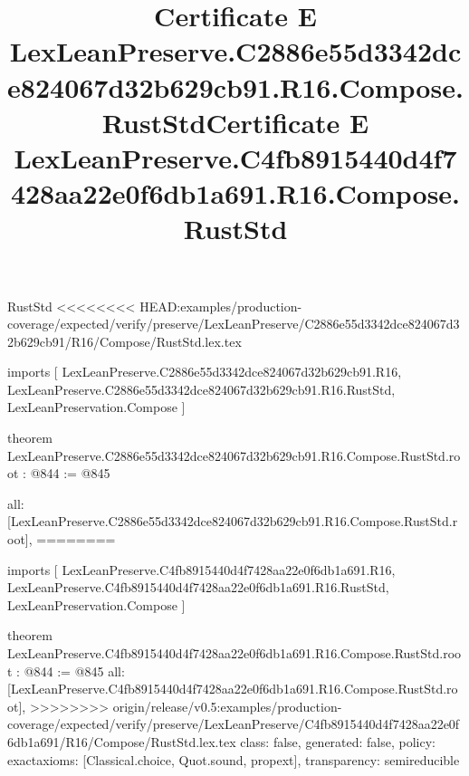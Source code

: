 \begin{lexlean}{RustStd}
<<<<<<<< HEAD:examples/production-coverage/expected/verify/preserve/LexLeanPreserve/C2886e55d3342dce824067d32b629cb91/R16/Compose/RustStd.lex.tex
\title{Certificate E LexLeanPreserve.C2886e55d3342dce824067d32b629cb91.R16.Compose.RustStd}
\begin{coremodule}
imports [
  LexLeanPreserve.C2886e55d3342dce824067d32b629cb91.R16,
  LexLeanPreserve.C2886e55d3342dce824067d32b629cb91.R16.RustStd,
  LexLeanPreservation.Compose
]

theorem LexLeanPreserve.C2886e55d3342dce824067d32b629cb91.R16.Compose.RustStd.root : @844 := @845 {
  all: [LexLeanPreserve.C2886e55d3342dce824067d32b629cb91.R16.Compose.RustStd.root],
========
\title{Certificate E LexLeanPreserve.C4fb8915440d4f7428aa22e0f6db1a691.R16.Compose.RustStd}
\begin{coremodule}
imports [
  LexLeanPreserve.C4fb8915440d4f7428aa22e0f6db1a691.R16,
  LexLeanPreserve.C4fb8915440d4f7428aa22e0f6db1a691.R16.RustStd,
  LexLeanPreservation.Compose
]

theorem LexLeanPreserve.C4fb8915440d4f7428aa22e0f6db1a691.R16.Compose.RustStd.root : @844 := @845 {
  all: [LexLeanPreserve.C4fb8915440d4f7428aa22e0f6db1a691.R16.Compose.RustStd.root],
>>>>>>>> origin/release/v0.5:examples/production-coverage/expected/verify/preserve/LexLeanPreserve/C4fb8915440d4f7428aa22e0f6db1a691/R16/Compose/RustStd.lex.tex
  class: false,
  generated: false,
  policy: exact{axioms: [Classical.choice, Quot.sound, propext]},
  transparency: semireducible
}


\end{coremodule}}
\end{coremodule}
\end{lexlean}

